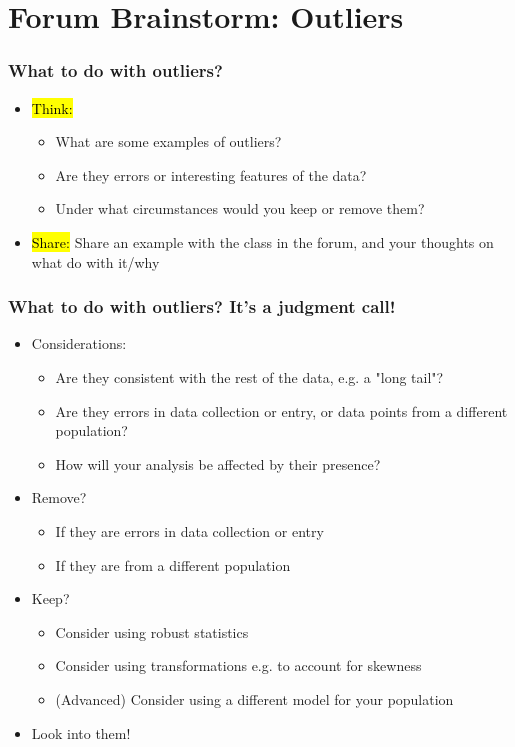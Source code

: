 \documentclass[slidestop,compress,mathserif]{beamer}
\begin{document}
\section{Forum Brainstorm: Outliers}

\begin{frame}
\frametitle{What to do with outliers?}
\begin{itemize}
\item \hl{Think:} 
\begin{itemize}
  \item What are some examples of outliers? 
  \item Are they errors or interesting features of the data?
  \item Under what circumstances would you keep or remove them?
\end{itemize}
\item \hl{Share:} Share an example with the class in the forum, and your thoughts on what do with it/why
\end{itemize}
\end{frame}

\begin{frame}
\frametitle{What to do with outliers? It's a judgment call!}
\begin{itemize}
  \item Considerations:
  \begin{itemize}
    \item Are they consistent with the rest of the data, e.g. a "long tail"?
    \item Are they errors in data collection or entry, or data points from a different population?
    \item How will your analysis be affected by their presence?
  \end{itemize}
  \item Remove?
  \begin{itemize}
    \item If they are errors in data collection or entry
    \item If they are from a different population
  \end{itemize}
  \item Keep?
  \begin{itemize}
    \item Consider using robust statistics
    \item Consider using transformations e.g. to account for skewness
    \item (Advanced) Consider using a different model for your population
  \end{itemize}
  \item Look into them!
\end{itemize}
\end{frame}
\end{document}
